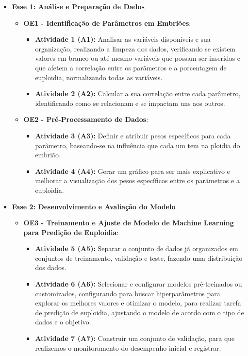 \begin{itemize}
    \item \textbf{Fase 1: Análise e Preparação de Dados}
    \begin{itemize}
        \item \textbf{OE1 - Identificação de Parâmetros em Embriões}: 
        \begin{itemize}
            \item \textbf{Atividade 1 (A1):} Analisar as variáveis disponíveis e sua organização, realizando a limpeza dos dados, verificando se existem valores em branco ou até mesmo variáveis que possam ser inseridas e que afetem a correlação entre os parâmetros e a porcentagem de euploidia, normalizando todas as variáveis. 
            \item \textbf{Atividade 2 (A2):} Calcular a sua correlação entre cada parâmetro, identificando como se relacionam e se impactam uns aos outros.
        \end{itemize}

        \item \textbf{OE2 - Pré-Processamento de Dados}: 
        \begin{itemize}
            \item \textbf{Atividade 3 (A3):} Definir e atribuir pesos específicos para cada parâmetro, baseando-se na influência que cada um tem na ploidia do embrião.
            \item \textbf{Atividade 4 (A4):} Gerar um gráfico para ser mais explicativo e melhorar a visualização dos pesos específicos entre os parâmetros e a euploidia.
        \end{itemize}
    \end{itemize}
    
    \item \textbf{Fase 2: Desenvolvimento e Avaliação do Modelo}
    \begin{itemize}
        \item \textbf{OE3 - Treinamento e Ajuste de Modelo de Machine Learning para Predição de Euploidia}: 
        \begin{itemize}
            \item \textbf{Atividade 5 (A5):} Separar o conjunto de dados já organizados em conjuntos de treinamento, validação e teste, fazendo uma distribuição dos dados.
            \item \textbf{Atividade 6 (A6):} Selecionar e configurar modelos pré-treinados ou customizados, configurando para buscar hiperparâmetros para explorar os melhores valores e otimizar o modelo, para realizar tarefa de predição de euploidia, ajustando o modelo de acordo com o tipo de dados e o objetivo.
            \item \textbf{Atividade 7 (A7):} Construir um conjunto de validação, para que realizemos o monitoramento do desempenho inicial e registrar.
        \end{itemize}


\end{itemize}
\end{itemize}

